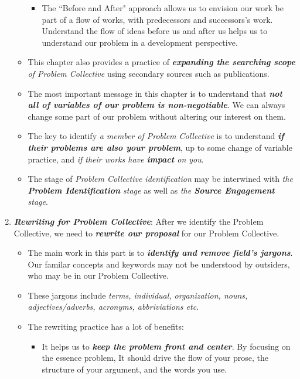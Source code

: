 \documentclass[11pt]{article}
\begin{document}
\begin{enumerate}
\begin{itemize}
\begin{itemize}
\item The ``Before and After" approach allows us to envision our work be part of a flow of works, with predecessors and successors's work. Understand the flow of ideas before us and after us helps us to understand our problem in a development perspective.
\end{itemize}

\item This chapter also provides a practice of \emph{\textbf{expanding the searching scope} of Problem Collective} using secondary sources such as publications. 

\item The most important message in this chapter is to understand that \emph{\textbf{not all of variables of our problem is non-negotiable}}. We can always change some part of our problem without altering our interest on them. 

\item The key to identify \emph{a member of Problem Collective} is to understand \emph{\textbf{if their problems are also your problem}}, up to some change of variable practice, and \emph{if their works have \textbf{impact} on you}.

\item The stage of \emph{Problem Collective identification} may be interwined with \emph{the \textbf{Problem Identification} stage} as well as \emph{the \textbf{Source Engagement} stage}.
\end{itemize}


\item  \emph{\textbf{Rewriting for Problem Collective}}: After we identify the Problem Collective, we need to \emph{\textbf{rewrite our proposal}} for our Problem Collective. 
\begin{itemize}
\item The main work in this part is to \emph{\textbf{identify and remove field's jargons}}.  Our familar concepts and keywords may not be understood by outsiders, who may be in our Problem Collective.

\item These jargons include \emph{terms, individual, organization, nouns, adjectives/adverbs, acronyms, abbriviations etc}.

\item The rewriting practice has a lot of benefits: 
\begin{itemize}
\item It helps us to \emph{\textbf{keep the problem front and center}}. By focusing on the essence problem, It should drive the flow of
your prose, the structure of your argument, and the words you use.


\end{itemize}
\end{itemize}
\end{enumerate}
\end{document}
